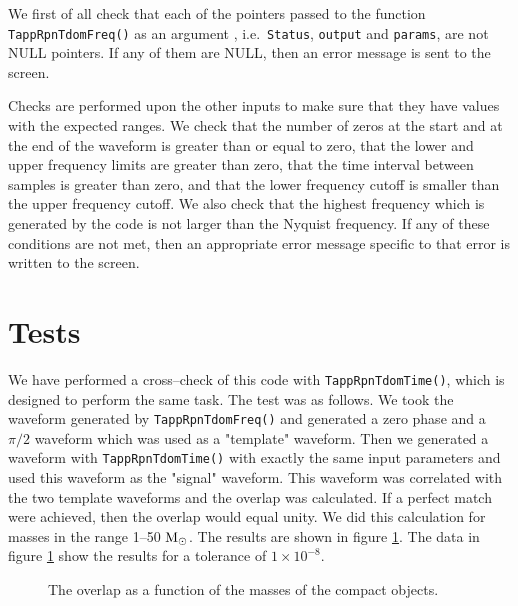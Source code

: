 \documentclass[12pt]{article}
\begin{document}
We first of all check that each of the pointers passed to the function \\ \texttt{TappRpnTdomFreq()} as an argument , i.e.\ \texttt{Status}, \texttt{output} and \texttt{params}, are not NULL pointers. If any of them are NULL, then an error message is sent to the screen.

Checks are performed upon the other inputs to make sure that they have values with the expected ranges. We check that the number of zeros at the start and at the end of the waveform is greater than or equal to zero, that the lower and upper frequency limits are greater than zero, that the time interval between samples is greater than zero, and that the lower frequency cutoff is smaller than the upper frequency cutoff. 
We also check that the highest frequency which is generated by the code is not larger than the Nyquist frequency. If any of these conditions are not met, then an appropriate error message specific to that error is written to the screen.

\section{Tests}

We have performed a cross--check of this code with \texttt{TappRpnTdomTime()}, which is designed to perform the same task. The test was as follows. We took the waveform generated by \texttt{TappRpnTdomFreq()} and generated a zero phase and a $\pi/2$ waveform which was used as a "template" waveform. Then we generated a waveform with \texttt{TappRpnTdomTime()} with exactly the same input parameters and used this waveform as the "signal" waveform. This waveform was correlated with the two template waveforms and the overlap was calculated. If a perfect match were achieved, then the overlap would equal unity. We did this calculation for masses in the range 1--50 $\rm{M_{\odot}}$. The results are shown in figure \ref{overlap1}. The data in figure \ref{overlap1} show the results for a tolerance of $1 \times 10^{-8}$. 

\begin{figure}
\begin{center}
\caption{The overlap as a function of the masses of the compact objects.}
\label{overlap1}
\end{center}
\end{figure}
\end{document}
